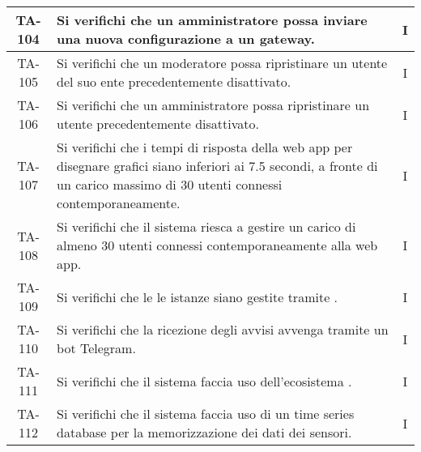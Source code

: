 \begin{center}
\begin{longtable}{|c|p{10cm}|c|}
			 \hline
			 TA-104 & Si verifichi che un amministratore possa inviare una nuova configurazione a un gateway. & I \\
			 \hline
			 TA-105 & Si verifichi che un moderatore possa ripristinare un utente del suo ente precedentemente disattivato. & I \\
			 \hline
			 TA-106 & Si verifichi che un amministratore possa ripristinare un utente precedentemente disattivato. & I \\
			 \hline
			 TA-107 & Si verifichi che i tempi di risposta della web app per disegnare grafici siano inferiori ai 7.5 secondi, a fronte di un carico massimo di 30 utenti connessi contemporaneamente. & I \\
			 \hline
			 TA-108 & Si verifichi che il sistema riesca a gestire un carico di almeno 30 utenti connessi contemporaneamente alla web app. & I \\
			 \hline
			 TA-109 & Si verifichi che le le istanze siano gestite tramite \glock{Docker}. & I \\
			 \hline
			 TA-110 & Si verifichi che la ricezione degli avvisi avvenga tramite un bot Telegram. & I \\
			 \hline
			 TA-111 & Si verifichi che il sistema faccia uso dell'ecosistema \glock{Kafka}. & I \\
			 \hline
			 TA-112 & Si verifichi che il sistema faccia uso di un time series database per la memorizzazione dei dati dei sensori. & I \\

\end{longtable}
\end{center}
